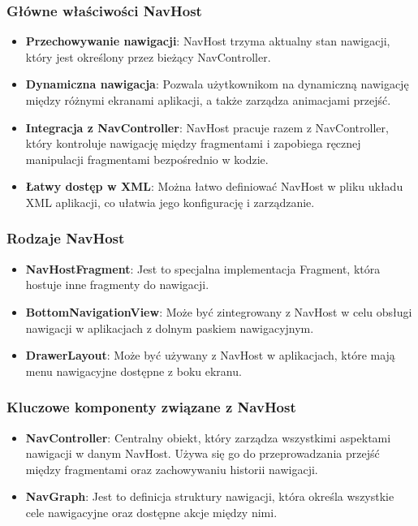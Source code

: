 \subsubsection{Główne właściwości NavHost}
\begin{itemize}
    \item \textbf{Przechowywanie nawigacji}: NavHost trzyma aktualny stan nawigacji, który jest określony przez bieżący NavController.
    \item \textbf{Dynamiczna nawigacja}: Pozwala użytkownikom na dynamiczną nawigację między różnymi ekranami aplikacji, a także zarządza animacjami przejść.
    \item \textbf{Integracja z NavController}: NavHost pracuje razem z NavController, który kontroluje nawigację między fragmentami i zapobiega ręcznej manipulacji fragmentami bezpośrednio w kodzie.
    \item \textbf{Łatwy dostęp w XML}: Można łatwo definiować NavHost w pliku układu XML aplikacji, co ułatwia jego konfigurację i zarządzanie.
\end{itemize}

\subsubsection{Rodzaje NavHost}
\begin{itemize}
    \item \textbf{NavHostFragment}: Jest to specjalna implementacja Fragment, która hostuje inne fragmenty do nawigacji.
    \item \textbf{BottomNavigationView}: Może być zintegrowany z NavHost w celu obsługi nawigacji w aplikacjach z dolnym paskiem nawigacyjnym.
    \item \textbf{DrawerLayout}: Może być używany z NavHost w aplikacjach, które mają menu nawigacyjne dostępne z boku ekranu.
\end{itemize}

\subsubsection{Kluczowe komponenty związane z NavHost}
\begin{itemize}
    \item \textbf{NavController}: Centralny obiekt, który zarządza wszystkimi aspektami nawigacji w danym NavHost. Używa się go do przeprowadzania przejść między fragmentami oraz zachowywaniu historii nawigacji.
    \item \textbf{NavGraph}: Jest to definicja struktury nawigacji, która określa wszystkie cele nawigacyjne oraz dostępne akcje między nimi.
\end{itemize}

